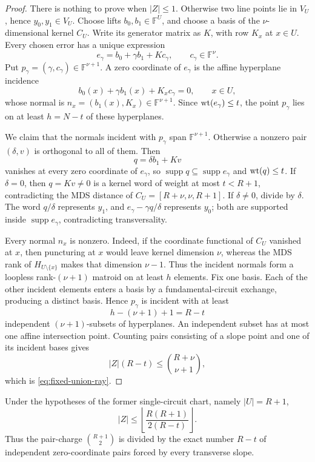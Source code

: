 \documentclass[11pt,a4paper]{amsart}
\numberwithin{equation}{section}
\theoremstyle{remark}
\DeclareMathOperator{\supp}{supp}\DeclareMathOperator{\Fib}{Fib}\DeclareMathOperator{\Sym}{Sym}
\newcommand{\F}{\mathbb F}\newcommand{\B}{\mathbb B}\newcommand{\K}{\mathbb K}\newcommand{\Z}{\mathbb Z}
\begin{document}
\begin{proof}
There is nothing to prove when \(|Z|\le1\).  Otherwise two line points lie
in \(V_U\), hence \(y_0,y_1\in V_U\).  Choose lifts
\(b_0,b_1\in\F^U\), and choose a basis of the \(\nu\)-dimensional kernel
\(C_U\).  Write its generator matrix as \(K\), with row \(K_x\) at
\(x\in U\).  Every chosen error has a unique expression
\[
 e_\gamma=b_0+\gamma b_1+Kc_\gamma,
 \qquad c_\gamma\in\F^\nu.
\]
Put \(p_\gamma=(\gamma,c_\gamma)\in\F^{\nu+1}\).  A zero coordinate of
\(e_\gamma\) is the affine hyperplane incidence
\begin{equation}
 b_0(x)+\gamma b_1(x)+K_xc_\gamma=0,
 \qquad x\in U,                                     \label{eq:fixed-union-hyperplane}
\end{equation}
whose normal is \(n_x=(b_1(x),K_x)\in\F^{\nu+1}\).  Since
\(\operatorname{wt}(e_\gamma)\le t\), the point \(p_\gamma\) lies on at least
\(h=N-t\) of these hyperplanes.

We claim that the normals incident with \(p_\gamma\) span
\(\F^{\nu+1}\).  Otherwise a nonzero pair \((\delta,v)\) is orthogonal
to all of them.  Then
\[
 q=\delta b_1+Kv
\]
vanishes at every zero coordinate of \(e_\gamma\), so
\(\supp q\subseteq\supp e_\gamma\) and \(\operatorname{wt}(q)\le t\).  If
\(\delta=0\), then \(q=Kv\ne0\) is a kernel word of weight at most
\(t<R+1\), contradicting the MDS distance of
\(C_U=[R+\nu,\nu,R+1]\).  If \(\delta\ne0\), divide by \(\delta\).
The word \(q/\delta\) represents \(y_1\), and
\(e_\gamma-\gamma q/\delta\) represents \(y_0\); both are supported
inside \(\supp e_\gamma\), contradicting transversality.

Every normal \(n_x\) is nonzero.  Indeed, if the coordinate functional of
\(C_U\) vanished at \(x\), then puncturing at \(x\) would leave kernel
dimension \(\nu\), whereas the MDS rank of \(H_{U\setminus\{x\}}\) makes
that dimension \(\nu-1\).  Thus the incident normals form a loopless
rank-\((\nu+1)\) matroid on at least \(h\) elements.  Fix one basis.
Each of the other incident elements enters a basis by a fundamental-circuit
exchange, producing a distinct basis.  Hence \(p_\gamma\) is incident with
at least
\[
 h-(\nu+1)+1=R-t
\]
independent \((\nu+1)\)-subsets of hyperplanes.  An independent subset
has at most one affine intersection point.  Counting pairs consisting of a
slope point and one of its incident bases gives
\[
 |Z|(R-t)\le\binom{R+\nu}{\nu+1},
\]
which is \eqref{eq:fixed-union-ray}.
\end{proof}

\begin{corollary}
\label{thm:single-mds-circuit-ray}
Under the hypotheses of the former single-circuit chart, namely
\(|U|=R+1\),
\begin{equation}
 |Z|\le
 \left\lfloor\frac{R(R+1)}{2(R-t)}\right\rfloor .
 \label{eq:single-circuit-multiplicity}
\end{equation}
Thus the pair-charge \(\binom{R+1}{2}\) is divided by the exact number
\(R-t\) of independent zero-coordinate pairs forced by every transverse
slope.
\end{corollary}
\end{document}

